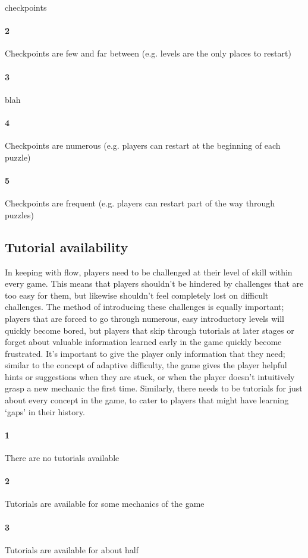 checkpoints\paragraph{2}Checkpoints are few and far between (e.g. levels are the only places to restart)\paragraph{3}blah\paragraph{4}Checkpoints are numerous (e.g. players can restart at the beginning of each puzzle)\paragraph{5}Checkpoints are frequent (e.g. players can restart part of the way through puzzles)\subsection{Tutorial availability}{In keeping with flow, players need to be challenged at their level of skill within every game. This means that players shouldn't be hindered by challenges that are too easy for them, but likewise shouldn't feel completely lost on difficult challenges. The method of introducing these challenges is equally important; players that are forced to go through numerous, easy introductory levels will quickly become bored, but players that skip through tutorials at later stages or forget about valuable information learned early in the game quickly become frustrated. It's important to give the player only information that they need; similar to the concept of adaptive difficulty, the game gives the player helpful hints or suggestions when they are stuck, or when the player doesn't intuitively grasp a new mechanic the first time. Similarly, there needs to be tutorials for just about every concept in the game, to cater to players that might have learning ‘gaps' in their history.} \paragraph{1}There are no tutorials available\paragraph{2}Tutorials are available for some mechanics of the game\paragraph{3}Tutorials are available for about half 